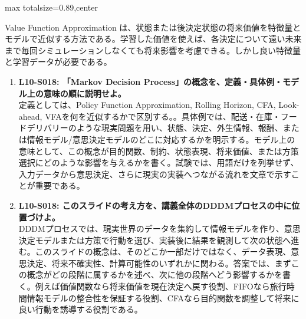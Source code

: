 \begin{minipage}[t]{0.58\textwidth}
\begin{adjustbox}{max totalsize={\textwidth}{0.89\textheight},center}
\begin{minipage}{\textwidth}
Value Function Approximation は、状態または後決定状態の将来価値を特徴量とモデルで近似する方法である。学習した価値を使えば、各決定について遠い未来まで毎回シミュレーションしなくても将来影響を考慮できる。しかし良い特徴量と学習データが必要である。\par{}\begin{enumerate}\item \textbf{L10-S018: 「Markov Decision Process」の概念を、定義・具体例・モデル上の意味の順に説明せよ。}\\定義としては、Policy Function Approximation, Rolling Horizon, CFA, Look-ahead, VFAを何を近似するかで区別する。。具体例では、配送・在庫・フードデリバリーのような現実問題を用い、状態、決定、外生情報、報酬、または情報モデル/意思決定モデルのどこに対応するかを明示する。モデル上の意味として、この概念が目的関数、制約、状態表現、将来価値、または方策選択にどのような影響を与えるかを書く。試験では、用語だけを列挙せず、入力データから意思決定、さらに現実の実装へつながる流れを文章で示すことが重要である。\item \textbf{L10-S018: このスライドの考え方を、講義全体のDDDMプロセスの中に位置づけよ。}\\DDDMプロセスでは、現実世界のデータを集約して情報モデルを作り、意思決定モデルまたは方策で行動を選び、実装後に結果を観測して次の状態へ進む。このスライドの概念は、そのどこか一部だけではなく、データ表現、意思決定、将来不確実性、計算可能性のいずれかに関わる。答案では、まずこの概念がどの段階に属するかを述べ、次に他の段階へどう影響するかを書く。例えば価値関数なら将来価値を現在決定へ戻す役割、FIFOなら旅行時間情報モデルの整合性を保証する役割、CFAなら目的関数を調整して将来に良い行動を誘導する役割である。\end{enumerate}
\end{minipage}
\end{adjustbox}
\end{minipage}


